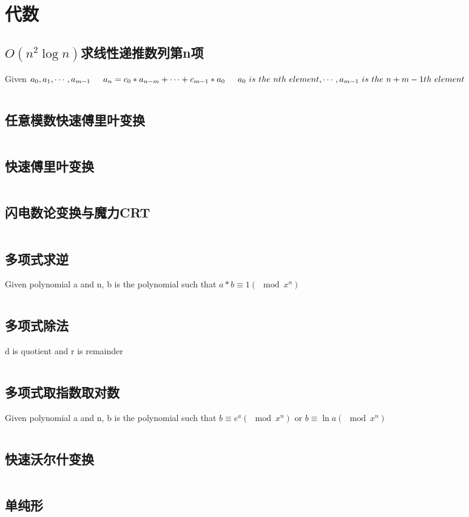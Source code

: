 \chapter{代数}
\section{$O(n^2\log n)$求线性递推数列第n项}
Given $a_0, a_1, \cdots , a_{m-1} \\
\indent a_n = c_0 * a_{n-m} + \cdots + c_{m-1} * a_0 \\
\indent a_0 \ is \ the \ nth \ element, \cdots, a_{m-1} \ is \ the \ n+m-1th \ element
$
\inputminted{cpp}{\source/algebra/linear-recursion.cpp}
\section{任意模数快速傅里叶变换}
\inputminted{cpp}{\source/algebra/FFT_1e9+7.cpp}
\section{快速傅里叶变换}
\inputminted{cpp}{\source/algebra/FFT.cpp}
\section{闪电数论变换与魔力CRT}
\inputminted{cpp}{\source/algebra/NTT+CRT.cpp}
\section{多项式求逆}
Given polynomial a and n, b is the polynomial such that $a * b \equiv 1 (\mod x^n) $
\inputminted{cpp}{\source/algebra/polynomial-inverse.cpp}
\section{多项式除法}
d is quotient and r is remainder
\inputminted{cpp}{\source/algebra/polynomial-divide.cpp}
\section{多项式取指数取对数}
Given polynomial a and n, b is the polynomial such that $b \equiv e^a (\mod x^n)$ or $b \equiv \ln a (\mod x^n)$
\inputminted{cpp}{\source/algebra/polynomial-expandln.cpp}
\section{快速沃尔什变换}
\inputminted{cpp}{\source/algebra/FWT.cpp}
\section{单纯形}
\inputminted{cpp}{\source/algebra/simplex.cpp}
